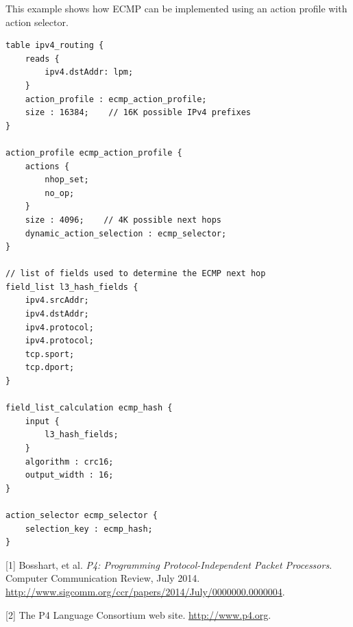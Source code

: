 \documentclass[12pt]{article}
\begin{document}

This example shows how ECMP can be implemented using an action profile with
action selector.

\begin{lstlisting}[style=P4style]
table ipv4_routing {
    reads {
        ipv4.dstAddr: lpm;
    }
    action_profile : ecmp_action_profile;
    size : 16384;    // 16K possible IPv4 prefixes
}

action_profile ecmp_action_profile {
    actions {
        nhop_set;
        no_op;
    }
    size : 4096;    // 4K possible next hops
    dynamic_action_selection : ecmp_selector;
}

// list of fields used to determine the ECMP next hop
field_list l3_hash_fields {
    ipv4.srcAddr;
    ipv4.dstAddr;
    ipv4.protocol;
    ipv4.protocol;
    tcp.sport;
    tcp.dport;
}

field_list_calculation ecmp_hash {
    input {
        l3_hash_fields;
    }
    algorithm : crc16;
    output_width : 16;
}

action_selector ecmp_selector {
    selection_key : ecmp_hash;
}
\end{lstlisting}


[1] Bosshart, et al. \textit{P4: Programming Protocol-Independent Packet Processors}. 
Computer Communication Review, July 2014.  \url{http://www.sigcomm.org/ccr/papers/2014/July/0000000.0000004}.

[2] The P4 Language Consortium web site. \url{http://www.p4.org}.
\end{document}
